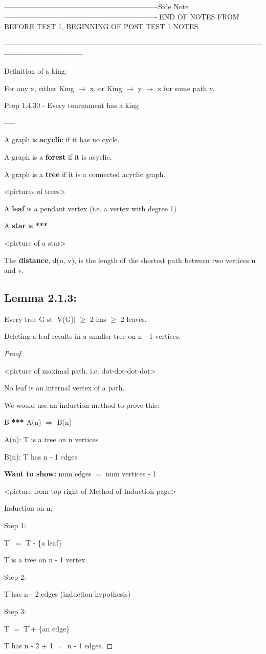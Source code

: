 \documentclass{article}
\newcommand{\mt}[1]{\ensuremath{#1}}
\newcommand\ssc[2][\DefaultOpt]{%
  \def\DefaultOpt{#2}%
  \subsection[#1]{#2}%
}
\newcommand{\bgpf}{\begin{proof} $ $\newline}
\newcommand{\wts}[1]{\textbf{Want to show: } #1}
\newcommand{\epf}{\end{proof}}
\newcommand{\sidenote}[1]{-----------------------------------------------------------------Side Note----------------------------------------------------------------
#1 \

---------------------------------------------------------------------------------------------------------------------------------------------}
\newcommand{\lra}{ \mt{\longrightarrow} } %
\newcommand{\rar}{ \mt{\Rightarrow} }     %
\newcommand{\av}[1]{\mt{|}#1\mt{|}}  %
\newcommand{\bk}[1]{\{#1\}}
\newcommand{\ps}{\mt{\operatorname{+}} }
\newcommand{\ms}{\mt{\operatorname{-}} }
\newcommand{\gre}{\mt{\operatorname{\geq}} }
\newcommand{\eql}{ \mt{\operatorname{=}} }
\newcommand{\pr}{\mt{^\prime}} 		   %
\begin{document}
\newpage

\sidenote{END OF NOTES FROM BEFORE TEST 1, BEGINNING OF POST TEST 1 NOTES}

Definition of a king:

For any x, either King \lra x, or King \lra y \lra x for some path y.

Prop 1.4.30 - Every tournament has a king

-----

A graph is \textbf{acyclic} if it has no cycle.

A graph is a \textbf{forest} if it is acyclic.

A graph is a \textbf{tree} if it is a connected acyclic graph.

<pictures of trees>

A \textbf{leaf} is a pendant vertex (i.e. a vertex with degree 1)

A \textbf{star} is \textbf{***}

<picture of a star>

The \textbf{distance}, d(u, v), is the length of the shortest path between two vertices u and v.

\ssc{Lemma 2.1.3:}{
Every tree G st \av{V(G)} \gre 2 has \gre 2 leaves.

Deleting a leaf results in a smaller tree on n \ms 1 vertices.

\bgpf

<picture of maximal path. i.e. dot-dot-dot-dot>

No leaf is an internal vertex of a path.

We would use an induction method to prove this:

B \textbf{***}  A(n) \rar B(n)

A(n): T is a tree on n vertices

B(n): T has n \ms 1 edges

\wts{num edges \eql num vertices - 1}

<picture from top right of Method of Induction page>

Induction on n:

Step 1: 

T\pr \eql T \ms \bk{a leaf}

T\pr is a tree on n \ms 1 vertex

Step 2:

T\pr has n \ms 2 edges (induction hypothesis)

Step 3:

T \eql T\pr \ps \bk{an edge}

T has n \ms 2 \ps 1 \eql n \ms 1 edges.

\epf

} 
\end{document}
